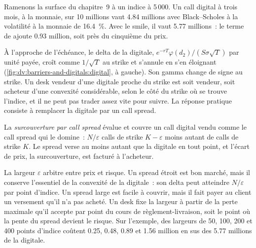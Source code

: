 \begin{example}\label{ex:dv:barriers-and-digitals:smile}
Ramenons la surface du chapitre~9 à un indice à 5\,000. Un call digital à trois mois, à la monnaie, sur 10 millions vaut
4.84 millions avec Black--Scholes à la volatilité à la monnaie de 16.4~\%. Avec le smile, il vaut 5.77 millions~:
le terme de  ajoute 0.93 million, soit près du cinquième du prix.
\end{example}

À l'approche de l'échéance, le delta de la digitale, $e^{-rT}\varphi(d_2)/(S\sigma\sqrt T)$ par unité payée, croît
comme $1/\sqrt T$ au strike et s'annule en s'en éloignant (\cref{fig:dv:barriers-and-digitals:digital}, à gauche).
Son gamma change de signe au strike. Un desk vendeur d'une digitale proche du strike est soit vendeur, soit acheteur
d'une convexité considérable, selon le côté du strike où se trouve l'indice, et il ne peut pas trader assez vite
pour suivre. La réponse pratique consiste à remplacer la digitale par un call spread.

\begin{definition}\label{def:dv:barriers-and-digitals:overhedge}
La \emph{surcouverture par call spread} évalue et couvre un call digital vendu
comme le call spread qui le domine~: $N/\varepsilon$ calls de strike $K-\varepsilon$ moins autant de calls de strike $K$. Le spread
verse au moins autant que la digitale en tout point, et l'écart de prix, la surcouverture, est facturé à l'acheteur.
\end{definition}

La largeur $\varepsilon$ arbitre entre prix et risque. Un spread étroit est bon marché, mais il conserve l'essentiel de la convexité de la digitale~: son delta peut atteindre
$N/\varepsilon$ par point d'indice. Un spread large est facile à couvrir, mais il fait payer au client un versement qu'il n'a pas acheté.
Un desk fixe la largeur à partir de la perte maximale qu'il accepte par point du cours de règlement-livraison, soit le point
où la pente du spread devient le risque. Sur l'exemple, des largeurs de 50, 100, 200
et 400 points d'indice coûtent 0.25, 0.48, 0.89 et 1.56 million en sus des 5.77 millions de la digitale.

